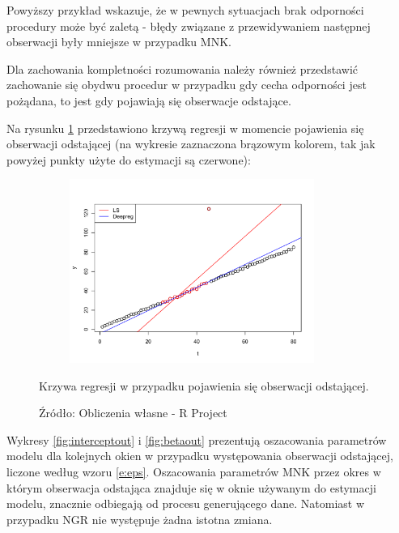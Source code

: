 \documentclass[man,mfu]{mgrwms}
\begin{document}
Powyższy przykład wskazuje, że w pewnych sytuacjach brak odporności procedury może być zaletą - błędy związane z przewidywaniem następnej obserwacji były mniejsze w przypadku MNK. 

Dla zachowania kompletności rozumowania należy również przedstawić zachowanie się obydwu procedur w przypadku gdy cecha odporności jest pożądana, to jest gdy pojawiają się obserwacje odstające.

Na rysunku \ref{fig:middle2} przedstawiono krzywą regresji w momencie pojawienia się obserwacji odstającej (na wykresie zaznaczona brązowym kolorem, tak jak powyżej punkty użyte do estymacji są czerwone):

\begin{figure}[H]
\centering
\vspace{-10pt}
\includegraphics[width=100mm,height = 60mm]{middle2}
\caption{Krzywa regresji w przypadku pojawienia się obserwacji odstającej.}
\caption*{Źródło: Obliczenia własne - R Project}
\label{fig:middle2}\vspace{-10pt}
\end{figure}

Wykresy \ref{fig:interceptout} i \ref{fig:betaout} prezentują oszacowania parametrów modelu dla kolejnych okien w przypadku występowania obserwacji odstającej, liczone według wzoru \ref{e:eps}. Oszacowania parametrów MNK przez okres w którym obserwacja odstająca znajduje się w oknie używanym do estymacji modelu, znacznie odbiegają od procesu generującego dane. Natomiast w przypadku NGR nie występuje żadna istotna zmiana.
\end{document}
